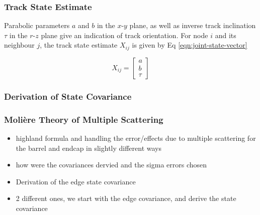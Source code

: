 

\subsubsection{Track State Estimate}

Parabolic parameters $a$ and $b$ in the $x$-$y$ plane, as well as inverse track inclination $\tau$ in the $r$-$z$ plane give an indication of track orientation. For node $i$ and its neighbour $j$, the track state estimate $X_{ij}$ is given by Eq \eqref{eqn:joint-state-vector}

\begin{equation}
X_{ij} = \begin{bmatrix} a \\ b \\ \tau \end{bmatrix}
\label{eqn:joint-state-vector}
\end{equation}


\subsubsection{Derivation of State Covariance}



\subsubsection{Molière Theory of Multiple Scattering}
\begin{itemize}
\item highland formula and handling the error/effects due to multiple scattering for the barrel and endcap in slightly different ways
\item how were the covariances dervied and the sigma errors chosen
\item Derivation of the edge state covariance
\item 2 different ones, we start with the edge covariance, and derive the state covariance
\end{itemize}





